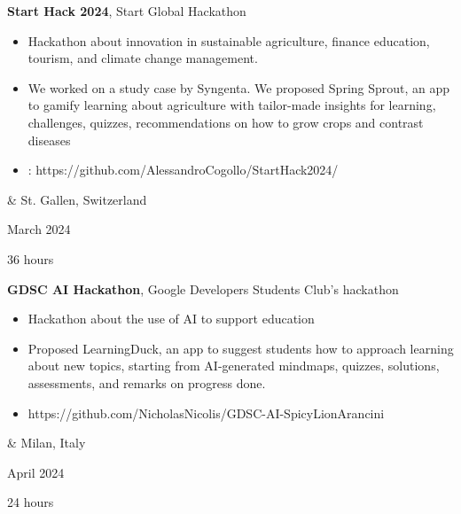 \documentclass[10pt, letterpaper]{article}
\newenvironment{highlights}{
        \begin{itemize}[
                topsep=0pt,
                parsep=0.10 cm,
                partopsep=0pt,
                itemsep=0pt,
                after=\vspace{-1\baselineskip},
                leftmargin=0.4 cm + 3pt
            ]
    }{
        \end{itemize}
    } %
\let\hrefWithoutArrow\href
\renewcommand{\href}[2]{\hrefWithoutArrow{#1}{\mbox{\ifthenelse{\equal{#2}{}}{ }{#2 }\raisebox{.15ex}{\footnotesize \faExternalLink*}}}}
\let\originalTabularx\tabularx
\let\originalEndTabularx\endtabularx
\renewenvironment{tabularx}{\bgroup\centering\originalTabularx}{\originalEndTabularx\par\egroup}
\begin{document}
        \begin{tabularx}{
            \textwidth-0.4 cm-0.13cm
        }{
            K{0.2 cm}
            R{4.1 cm}
        }
            \textbf{Start Hack 2024}, Start Global Hackathon

            \vspace{0.10 cm}

            \begin{highlights}
                \item Hackathon about innovation in sustainable agriculture, finance education, tourism, and climate change management. 
                \item We worked on a study case by Syngenta. We proposed Spring Sprout, an app to gamify learning about agriculture with tailor-made insights for learning, challenges, quizzes, recommendations on how to grow crops and contrast diseases
                \item \href{https://github.com/AlessandroCogollo/StartHack2024/}{Link}: https://github.com/AlessandroCogollo/StartHack2024/
            \end{highlights}
            &
            St. Gallen, Switzerland

            March 2024

            36 hours
        \end{tabularx}

        \vspace{0.2 cm}
 \begin{tabularx}{
            \textwidth-0.4 cm-0.13cm
        }{
            K{0.2 cm}
            R{4.1 cm}
        }
            \textbf{GDSC AI Hackathon}, Google Developers Students Club's hackathon

            \vspace{0.10 cm}

            \begin{highlights}
                \item Hackathon about the use of AI to support education
                \item Proposed LearningDuck, an app to suggest students how to approach learning about new topics, starting from AI-generated mindmaps, quizzes, solutions, assessments, and remarks on progress done.  
                \item \href{https://github.com/NicholasNicolis/GDSC-AI-SpicyLionArancini}{Link:} https://github.com/NicholasNicolis/GDSC-AI-SpicyLionArancini
            \end{highlights}
            &
            Milan, Italy

            April 2024

            24 hours
        \end{tabularx}
       
\end{document}
